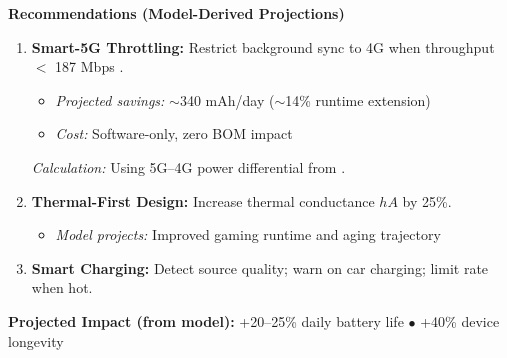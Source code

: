 \documentclass[12pt]{article}
\begin{document}
\vspace{0.5em}
\noindent\textbf{Recommendations (Model-Derived Projections)}
\begin{enumerate}
    \item \textbf{Smart-5G Throttling:} Restrict background sync to 4G when throughput $<$ 187 Mbps \cite{narayanan_5g}.
    \begin{itemize}
        \item \textit{Projected savings:} $\sim$340 mAh/day ($\sim$14\% runtime extension)
        \item \textit{Cost:} Software-only, zero BOM impact
    \end{itemize}
    \textit{Calculation:} Using 5G--4G power differential from \cite{narayanan_5g}.
    
    \item \textbf{Thermal-First Design:} Increase thermal conductance $hA$ by 25\%.
    \begin{itemize}
        \item \textit{Model projects:} Improved gaming runtime and aging trajectory
    \end{itemize}
    
    \item \textbf{Smart Charging:} Detect source quality; warn on car charging; limit rate when hot.
\end{enumerate}

\vspace{0.5em}
\noindent\textbf{Projected Impact (from model):} +20--25\% daily battery life $\bullet$ +40\% device longevity
\end{document}
